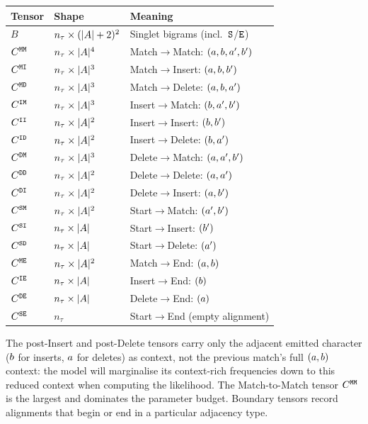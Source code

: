 \begin{center}
\begin{tabular}{lll}
\hline
\textbf{Tensor} & \textbf{Shape} & \textbf{Meaning} \\
\hline
$B$ & $n_\tau \times (|A|+2)^2$
& Singlet bigrams (incl.\ ${\tt S}$/${\tt E}$) \\
$C^{{\tt M}{\tt M}}$ & $n_\tau \times |A|^4$
& Match$\to$Match: $(a,b,a',b')$ \\
$C^{{\tt M}{\tt I}}$ & $n_\tau \times |A|^3$
& Match$\to$Insert: $(a,b,b')$ \\
$C^{{\tt M}{\tt D}}$ & $n_\tau \times |A|^3$
& Match$\to$Delete: $(a,b,a')$ \\
$C^{{\tt I}{\tt M}}$ & $n_\tau \times |A|^3$
& Insert$\to$Match: $(b,a',b')$ \\
$C^{{\tt I}{\tt I}}$ & $n_\tau \times |A|^2$
& Insert$\to$Insert: $(b,b')$ \\
$C^{{\tt I}{\tt D}}$ & $n_\tau \times |A|^2$
& Insert$\to$Delete: $(b,a')$ \\
$C^{{\tt D}{\tt M}}$ & $n_\tau \times |A|^3$
& Delete$\to$Match: $(a,a',b')$ \\
$C^{{\tt D}{\tt D}}$ & $n_\tau \times |A|^2$
& Delete$\to$Delete: $(a,a')$ \\
$C^{{\tt D}{\tt I}}$ & $n_\tau \times |A|^2$
& Delete$\to$Insert: $(a,b')$ \\
$C^{{\tt S}{\tt M}}$ & $n_\tau \times |A|^2$
& Start$\to$Match: $(a',b')$ \\
$C^{{\tt S}{\tt I}}$ & $n_\tau \times |A|$
& Start$\to$Insert: $(b')$ \\
$C^{{\tt S}{\tt D}}$ & $n_\tau \times |A|$
& Start$\to$Delete: $(a')$ \\
$C^{{\tt M}{\tt E}}$ & $n_\tau \times |A|^2$
& Match$\to$End: $(a,b)$ \\
$C^{{\tt I}{\tt E}}$ & $n_\tau \times |A|$
& Insert$\to$End: $(b)$ \\
$C^{{\tt D}{\tt E}}$ & $n_\tau \times |A|$
& Delete$\to$End: $(a)$ \\
$C^{{\tt S}{\tt E}}$ & $n_\tau$
& Start$\to$End (empty alignment) \\
\hline
\end{tabular}
\end{center}

The post-Insert and post-Delete tensors carry only the adjacent emitted
character ($b$ for inserts, $a$ for deletes) as context,
not the previous match's full $(a,b)$ context: the model
will marginalise its context-rich frequencies down to this reduced
context when computing the likelihood. The Match-to-Match
tensor $C^{{\tt M}{\tt M}}$ is the largest and dominates the parameter
budget. Boundary tensors record alignments that begin or end
in a particular adjacency type.

